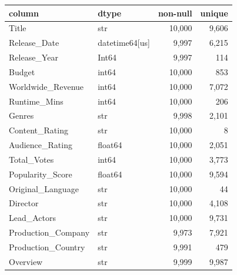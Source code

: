 \begin{tabular}{llrr}
\toprule
column & dtype & non-null & unique \\
\midrule
Title & str & 10{,}000 & 9{,}606 \\
Release\_Date & datetime64[us] & 9{,}997 & 6{,}215 \\
Release\_Year & Int64 & 9{,}997 & 114 \\
Budget & int64 & 10{,}000 & 853 \\
Worldwide\_Revenue & int64 & 10{,}000 & 7{,}072 \\
Runtime\_Mins & int64 & 10{,}000 & 206 \\
Genres & str & 9{,}998 & 2{,}101 \\
Content\_Rating & str & 10{,}000 & 8 \\
Audience\_Rating & float64 & 10{,}000 & 2{,}051 \\
Total\_Votes & int64 & 10{,}000 & 3{,}773 \\
Popularity\_Score & float64 & 10{,}000 & 9{,}594 \\
Original\_Language & str & 10{,}000 & 44 \\
Director & str & 10{,}000 & 4{,}108 \\
Lead\_Actors & str & 10{,}000 & 9{,}731 \\
Production\_Company & str & 9{,}973 & 7{,}921 \\
Production\_Country & str & 9{,}991 & 479 \\
Overview & str & 9{,}999 & 9{,}987 \\
\bottomrule
\end{tabular}
